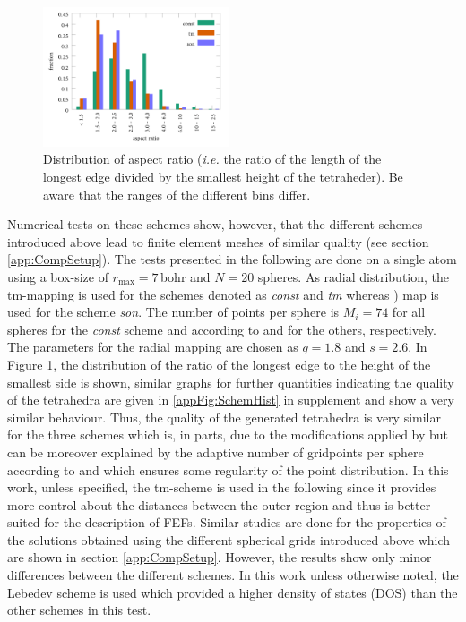 \begin{figure}
\includegraphics[width=0.49\textwidth]{Figures/Radi_hist.pdf}
\caption{Distribution of aspect ratio (\textit{i.e.} the ratio of the length of the longest edge divided by the smallest height of the tetraheder).
   Be aware that the ranges of the different bins differ.}
\label{fig:SchemHist}
\end{figure}
Numerical tests on these schemes show, however, that the different schemes introduced above lead to finite element meshes of similar quality (see section \ref{app:CompSetup}).
The tests presented in the following are done on a single atom using a box-size of $r_\text{max}=7\,$bohr and $N=20$ spheres.
As radial distribution, the tm-mapping  is used for the schemes denoted as \textit{const} and \textit{tm} whereas ) map is used for the scheme \textit{son}.
The number of points per sphere is $M_i=74$ for all spheres for the \textit{const} scheme and according to  and  for the others, respectively.
The parameters for the radial mapping are chosen as $q=1.8$ and $s=2.6$.
In Figure \ref{fig:SchemHist}, the distribution of the ratio of the longest edge to the height of the smallest side is shown, similar graphs for further quantities indicating the quality of the tetrahedra are given in \ref{appFig:SchemHist} in supplement and show a very similar behaviour.
Thus, the quality of the generated tetrahedra is very similar for the three schemes which is, in parts, due to the modifications applied by  but can be moreover explained by the adaptive number of gridpoints per sphere according to  and  which ensures some regularity of the point distribution.
In this work, unless specified, the tm-scheme is used in the following since it provides more control about the distances between the outer region and thus is better suited for the description of FEFs.
Similar studies are done for the properties of the solutions obtained using the different spherical grids introduced above which are shown in section \ref{app:CompSetup}.
However, the results show only minor differences between the different schemes.
In this work unless otherwise noted, the Lebedev scheme is used which provided a higher density of states (DOS) than the other schemes in this test.
